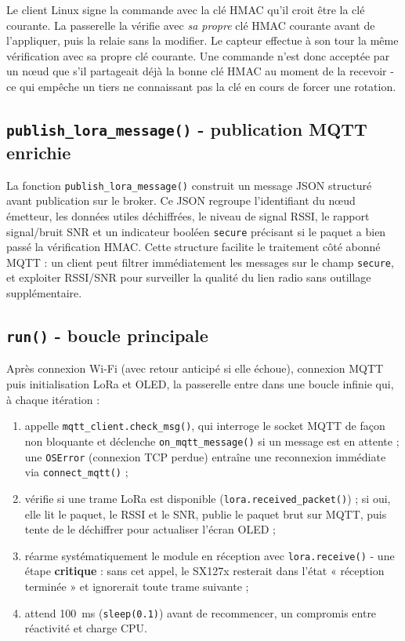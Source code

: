 \documentclass[a4paper,11pt]{report}
\begin{document}
\begin{explication}
Le client Linux signe la commande avec la clé HMAC qu'il croit être la clé courante. La passerelle la
vérifie avec \emph{sa propre} clé HMAC courante avant de l'appliquer, puis la relaie sans la modifier.
Le capteur effectue à son tour la même vérification avec sa propre clé courante. Une commande n'est donc
acceptée par un nœud que s'il partageait déjà la bonne clé HMAC au moment de la recevoir - ce qui
empêche un tiers ne connaissant pas la clé en cours de forcer une rotation.
\end{explication}

\subsection{\texttt{publish\_lora\_message()} - publication MQTT enrichie}
La fonction \texttt{publish\_lora\_message()} construit un message JSON structuré avant publication sur
le broker. Ce JSON regroupe l'identifiant du nœud émetteur, les données utiles déchiffrées, le niveau de
signal RSSI, le rapport signal/bruit SNR et un indicateur booléen \texttt{secure} précisant si le paquet
a bien passé la vérification HMAC. Cette structure facilite le traitement côté abonné MQTT : un client
peut filtrer immédiatement les messages sur le champ \texttt{secure}, et exploiter RSSI/SNR pour surveiller
la qualité du lien radio sans outillage supplémentaire.

\subsection{\texttt{run()} - boucle principale}
Après connexion Wi-Fi (avec retour anticipé si elle échoue), connexion MQTT puis initialisation LoRa et
OLED, la passerelle entre dans une boucle infinie qui, à chaque itération :
\begin{enumerate}
    \item appelle \texttt{mqtt\_client.check\_msg()}, qui interroge le socket MQTT de façon non
    bloquante et déclenche \texttt{on\_mqtt\_message()} si un message est en attente ; une
    \texttt{OSError} (connexion TCP perdue) entraîne une reconnexion immédiate via \texttt{connect\_mqtt()} ;
    \item vérifie si une trame LoRa est disponible (\texttt{lora.received\_packet()}) ; si oui, elle lit
    le paquet, le RSSI et le SNR, publie le paquet brut sur MQTT, puis tente de le déchiffrer pour
    actualiser l'écran OLED ;
    \item réarme systématiquement le module en réception avec \texttt{lora.receive()} - une étape
    \textbf{critique} : sans cet appel, le SX127x resterait dans l'état « réception terminée » et
    ignorerait toute trame suivante ;
    \item attend \SI{100}{\milli\second} (\texttt{sleep(0.1)}) avant de recommencer, un compromis entre
    réactivité et charge CPU.
\end{enumerate}
\end{document}

